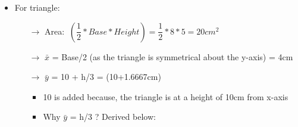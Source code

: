 \documentclass[8pt]{report}
\begin{document}
\begin{itemize}
			\item For triangle: 
				\begin{itemize}
					\item[$\rightarrow$] Area:$\;\;\left(\dfrac{1}{2}*Base*Height\right) = \dfrac{1}{2}*8*5 = 20cm^2$
					\item[$\rightarrow$] $\bar{x}$ = Base/2 (as the triangle is symmetrical about the y-axis) = 4cm
					\item[$\rightarrow$] $\bar{y}$ = 10 + h/3 = (10+1.6667cm)
						\begin{itemize}
							\item 10 is added because, the triangle is at a height of 10cm from x-axis
							\item Why $\bar{y}$ = h/3 ? Derived below:
						\end{itemize}
				\end{itemize}							
		\end{itemize}\hrulefill
\end{document}
